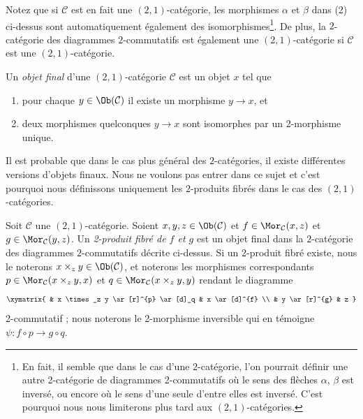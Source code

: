 Notez que si $\mathcal{C}$ est en fait une $(2, 1)$-catégorie, les morphismes
$\alpha$ et $\beta$ dans (2) ci-dessus sont automatiquement également des
isomorphismes\footnote{En fait, il semble que dans le cas d'une $2$-catégorie,
l'on pourrait définir une autre 2-catégorie de diagrammes 2-commutatifs où le
sens des flèches $\alpha$, $\beta$ est inversé, ou encore où le sens d'une
seule d'entre elles est inversé. C'est pourquoi nous nous limiterons plus tard
aux $(2, 1)$-catégories.}. De plus, la $2$-catégorie des diagrammes
$2$-commutatifs est également une $(2, 1)$-catégorie si $\mathcal{C}$ est une
$(2, 1)$-catégorie.

\begin{definition}
\label{definition-final-object-2-category}
Un {\it objet final} d'une $(2, 1)$-catégorie $\mathcal{C}$ est un objet $x$
tel que
\begin{enumerate}
\item pour chaque $y \in \Ob(\mathcal{C})$ il existe un morphisme $y \to x$,
et
\item deux morphismes quelconques $y \to x$ sont isomorphes par un 2-morphisme
unique.
\end{enumerate}
\end{definition}

\noindent
Il est probable que dans le cas plus général des $2$-catégories, il existe
différentes versions d'objets finaux. Nous ne voulons pas entrer dans ce sujet
et c'est pourquoi nous définissons uniquement les $2$-produits fibrés dans
le cas des $(2, 1)$-catégories.

\begin{definition}
\label{definition-2-fibre-products}
Soit $\mathcal{C}$ une $(2, 1)$-catégorie. Soient $x, y, z\in \Ob(\mathcal{C})$ et $f\in \Mor_\mathcal{C}(x, z)$ et $g\in \Mor_{\mathcal C}(y, z)$. Un {\it 2-produit fibré de $f$ et $g$} est un objet final dans
la $2$-catégorie des diagrammes $2$-commutatifs décrite ci-dessus. Si un 2-produit
fibré existe, nous le noterons $x \times_z y\in \Ob(\mathcal{C})$, et
noterons les morphismes correspondants $p\in \Mor_{\mathcal C}(x \times_z y, x)$ et
$q\in \Mor_{\mathcal C}(x \times_z y, y)$ rendant le diagramme
$$
\xymatrix{
& x \times_z y \ar[r]^{p} \ar[d]_q & x \ar[d]^{f} \\
& y \ar[r]^{g} & z }
$$
2-commutatif ; nous noterons le 2-morphisme inversible qui en témoigne
$\psi : f \circ p \to g \circ q$.
\end{definition}

